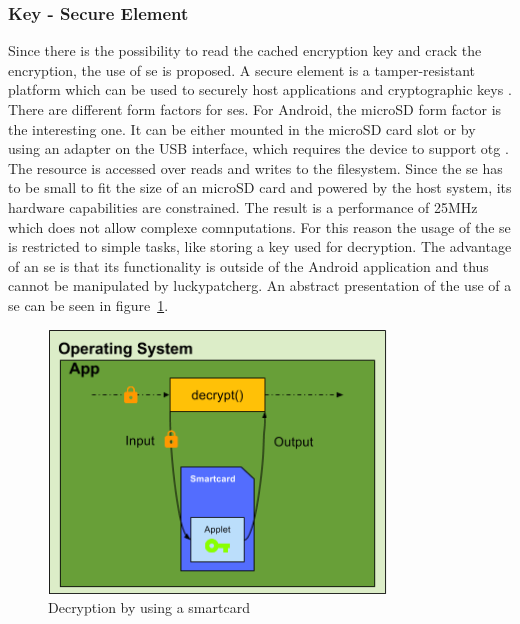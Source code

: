 \subsubsection{Key - Secure Element} \label{section:counter-replace-encryption-key-local}
Since there is the possibility to read the cached encryption key \cite{memoryDump} and crack the encryption, the use of \gls{se} is proposed.
A secure element is a tamper-resistant platform which can be used to securely host applications and cryptographic keys \cite{seDefinition}.
There are different form factors for \gls{se}s.
For Android, the microSD form factor is the interesting one.
It can be either mounted in the microSD card slot or by using an adapter on the USB interface, which requires the device to support \gls{otg} \cite{usbOtg}.
The resource is accessed over reads and writes to the filesystem.
Since the \gls{se} has to be small to fit the size of an microSD card and powered by the host system, its hardware capabilities are constrained.
The result is a performance of 25MHz which does not allow complexe comnputations. \cite{stSe}
\newline
For this reason the usage of the \gls{se} is restricted to simple tasks, like storing a key used for decryption.
The advantage of an \gls{se} is that its functionality is outside of the Android application and thus cannot be manipulated by \gls{luckypatcherg}.
\newline
An abstract presentation of the use of a \gls{se} can be seen in figure~\ref{fig:encryptionKeySmart}.
\newline
\begin{figure}[h]
    \centering
    \includegraphics[width=0.8\textwidth]{data/encryptionKeySmart.png}
    \caption{Decryption by using a smartcard}
    \label{fig:encryptionKeySmart}
\end{figure}

